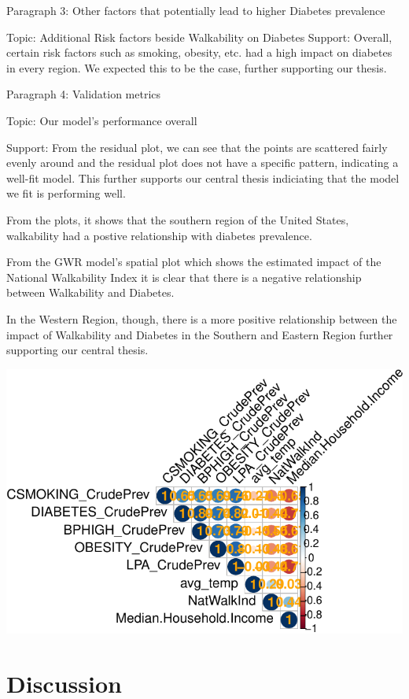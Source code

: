 \documentclass[
]{article}
\begin{document}
Paragraph 3: Other factors that potentially lead to higher Diabetes
prevalence

Topic: Additional Risk factors beside Walkability on Diabetes Support:
Overall, certain risk factors such as smoking, obesity, etc. had a high
impact on diabetes in every region. We expected this to be the case,
further supporting our thesis.

Paragraph 4: Validation metrics

Topic: Our model's performance overall

Support: From the residual plot, we can see that the points are
scattered fairly evenly around and the residual plot does not have a
specific pattern, indicating a well-fit model. This further supports our
central thesis indiciating that the model we fit is performing well.

From the plots, it shows that the southern region of the United States,
walkability had a postive relationship with diabetes prevalence.

From the GWR model's spatial plot which shows the estimated impact of
the National Walkability Index it is clear that there is a negative
relationship between Walkability and Diabetes.

In the Western Region, though, there is a more positive relationship
between the impact of Walkability and Diabetes in the Southern and
Eastern Region further supporting our central thesis.

\includegraphics{report_files/figure-pdf/unnamed-chunk-6-1.pdf}

\section{Discussion}\label{discussion}
\end{document}
